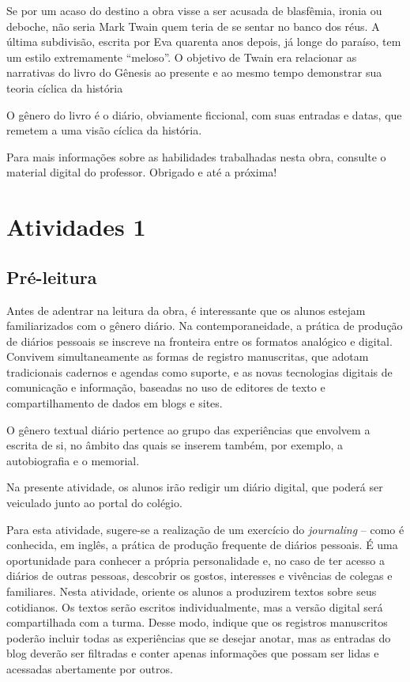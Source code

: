 \documentclass[12pt]{extarticle}
\begin{document}
Se por um acaso do destino a obra visse a ser acusada de blasfêmia, ironia ou deboche, 
não seria Mark Twain quem teria de se sentar no banco dos réus.
A última subdivisão, escrita por Eva quarenta anos depois, já longe do paraíso, 
tem um estilo extremamente “meloso”.
O objetivo de Twain era relacionar as narrativas do livro do Gênesis 
ao presente e ao mesmo tempo demonstrar sua teoria cíclica da história

O gênero do livro é o diário, obviamente ficcional, 
com suas entradas e datas, que remetem a uma visão cíclica da história.




Para mais informações sobre as habilidades trabalhadas nesta obra, consulte o material digital do professor. Obrigado e até a próxima!


\section{Atividades 1}


\subsection{Pré-leitura}


Antes de adentrar na leitura da obra, é interessante que os
alunos estejam familiarizados com o gênero diário. Na contemporaneidade,
a prática de produção de diários pessoais se inscreve na fronteira entre
os formatos analógico e digital. Convivem simultaneamente as formas de
registro manuscritas, que adotam tradicionais cadernos e agendas como
suporte, e as novas tecnologias digitais de comunicação e informação,
baseadas no uso de editores de texto e compartilhamento de dados em
blogs e sites.

O gênero textual diário pertence ao grupo das experiências que envolvem
a escrita de si, no âmbito das quais se inserem também, por exemplo, a
autobiografia e o memorial.

Na presente atividade, os alunos irão redigir um diário digital, que
poderá ser veiculado junto ao portal do colégio.

Para esta atividade, sugere-se a realização de um exercício do
\emph{journaling} -- como é conhecida, em inglês, a prática de produção
frequente de diários pessoais. É uma oportunidade para conhecer a
própria personalidade e, no caso de ter acesso a diários de outras
pessoas, descobrir os gostos, interesses e vivências de colegas e
familiares. Nesta atividade, oriente os alunos a produzirem textos sobre
seus cotidianos. Os textos serão escritos individualmente, mas a versão
digital será compartilhada com a turma. Desse modo, indique que os
registros manuscritos poderão incluir todas as experiências que se
desejar anotar, mas as entradas do blog deverão ser filtradas e conter
apenas informações que possam ser lidas e acessadas abertamente por
outros.
\end{document}
